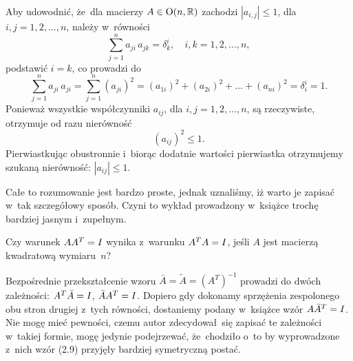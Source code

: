 \documentclass[a4paper,11pt]{article}
\begin{document}
\vspace{\spaceFour}





 Aby udowodnić, że~dla macierzy $A \in \mathbf{\mathrm{O}}( n, \mathbb{R} )$
zachodzi $| a_{ i, j } | \leq 1$, dla $i, j = 1, 2, \ldots, n$, należy w~równości
\begin{equation}
  \label{eq:Wojtynski-04}
  \sum_{ j = 1 }^{ n } a_{ j i } \, a_{ j k } = \delta_{ k }^{ i }, \quad
  i, k = 1, 2, \ldots, n,
\end{equation}
podstawić $i = k$, co prowadzi do
\begin{equation}
  \label{eq:Wojtynski-05}
  \sum_{ j = 1 }^{ n } a_{ j i } \, a_{ j i } =
  \sum_{ j = 1 }^{ n } ( a_{ j i } )^{ 2 } =
  ( a_{ 1 i } )^{ 2 } + ( a_{ 2 i } )^{ 2 } + \ldots + ( a_{ n i } )^{ 2 } =
  \delta^{ i }_{ i } = 1.
\end{equation}
Ponieważ wszystkie współczynniki $a_{ i j }$, dla $i, j = 1, 2, \ldots, n$, są
rzeczywiste, otrzymuje od razu nierówność
\begin{equation}
  \label{eq:Wojtynski-06}
  ( a_{ i j } )^{ 2 } \leq 1.
\end{equation}
Pierwiastkując obustronnie i~biorąc dodatnie wartości pierwiastka
otrzymujemy szukaną nierówność: $| a_{ i j } | \leq 1$.

Całe to rozumowanie jest bardzo proste, jednak uznaliśmy, iż warto je
zapisać w~tak szczegółowy sposób. Czyni to wykład prowadzony w~książce
trochę bardziej jasnym i~zupełnym.

\vspace{\spaceFour}





 Czy warunek $A A^{ T } = I$ wynika z~warunku
$A^{ T } A = I$, jeśli $A$ jest macierzą kwadratową wymiaru~$n$?

\vspace{\spaceFour}





 Bezpośrednie przekształcenie wzoru
$\bar{A} = \widetilde{A} = ( A^{ T } )^{ -1 }$ prowadzi do dwóch zależności:
$A^{ T } \bar{A} = I$, $\bar{A} A^{ T } = I$. Dopiero gdy
dokonamy sprzężenia zespolonego obu stron drugiej z~tych równości,
dostaniemy podany w~książce wzór $A \bar{A}^{ T } = I$. Nie mogę
mieć pewności, czemu autor zdecydował~się zapisać te zależności w~takiej
formie, mogę jedynie podejrzewać, że~chodziło o~to by wyprowadzone z~nich
wzór (2.9) przyjęły bardziej symetryczną postać.
\end{document}
